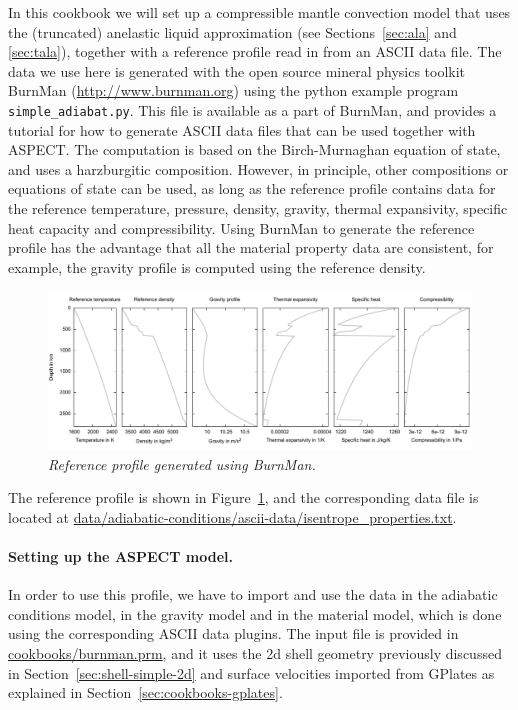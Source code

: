\documentclass{article}
\newcommand{\aspect}{\textsc{ASPECT}}
\begin{document}
In this cookbook we will set up a compressible mantle convection model that uses 
the (truncated) anelastic liquid approximation (see Sections~\ref{sec:ala} and 
\ref{sec:tala}), together with a reference profile read in from an ASCII data file.
The data we use here is generated with the open source mineral physics toolkit BurnMan 
(\url{http://www.burnman.org}) using the python example program \texttt{simple\_adiabat.py}. 
This file is available as a part of BurnMan, and provides a tutorial for how to generate 
ASCII data files that can be used together with \aspect{}. 
The computation is based on the Birch-Murnaghan equation of state, and uses a harzburgitic 
composition. However, in principle, other compositions or equations of state can be used, 
as long as the reference profile contains data for the reference temperature, pressure, density, 
gravity, thermal expansivity, specific heat capacity and compressibility. Using BurnMan 
to generate the reference profile has the advantage that all the material property data 
are consistent, for example, the gravity profile is computed using the reference density.
\begin{figure}
  \includegraphics[width=\textwidth]{cookbooks/burnman/reference_profile.pdf}
  \caption{\it Reference profile generated using BurnMan.}
  \label{fig:burnman-reference-profile}
\end{figure}
The reference profile is shown in Figure~\ref{fig:burnman-reference-profile}, and the corresponding data file 
is located at \url{data/adiabatic-conditions/ascii-data/isentrope_properties.txt}.

\paragraph{Setting up the \aspect{} model.}
In order to use this profile, we have to import and use the data in the adiabatic conditions 
model, in the gravity model and in the material model, which is done using the corresponding 
ASCII data plugins. The input file is provided in \url{cookbooks/burnman.prm}, and it uses the 
2d shell geometry previously discussed in Section~\ref{sec:shell-simple-2d} and surface velocities
imported from GPlates as explained in Section~\ref{sec:cookbooks-gplates}.
\end{document}
